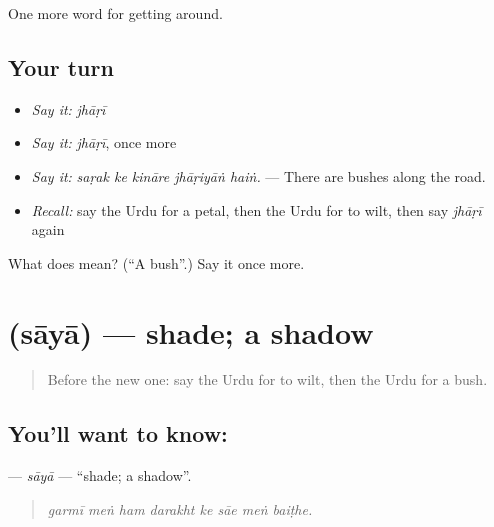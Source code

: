 \begin{grammarlens}[title={What you've built}]
One more word for getting around.
\end{grammarlens}

\subsection*{Your turn}
\begin{itemize}
\raggedright
  \item \emph{Say it:} \emph{jhāṛī}
  \item \emph{Say it:} \emph{jhāṛī}, once more
  \item \emph{Say it:} \emph{saṛak ke kināre jhāṛiyāṅ haiṅ.} — There are bushes along the road.
  \item \emph{Recall:} say the Urdu for a petal, then the Urdu for to wilt, then say \emph{jhāṛī} again
\end{itemize}

\begin{tcolorbox}[breakable,colback=teal!4,colframe=teal!35!black,title={Before you move on}]
What does  mean? (\textquotedblleft{}A bush\textquotedblright{}.) Say it once more.
\end{tcolorbox}
\section[\texorpdfstring{\ur{سایہ} (sāyā)}{سایہ (sāyā)}]{ (sāyā) — shade; a shadow}

\label{lesson:UR-C437-saya}



\begin{quote}
Before the new one: say the Urdu for to wilt, then the Urdu for a bush.
\end{quote}

\subsection*{You'll want to know: }
\textbf{} — \emph{sāyā} — \textquotedblleft{}shade; a shadow\textquotedblright{}.

\begin{quote}
       
\end{quote}

\begin{quote}
\emph{garmī meṅ ham darakht ke sāe meṅ baiṭhe.}
\end{quote}

